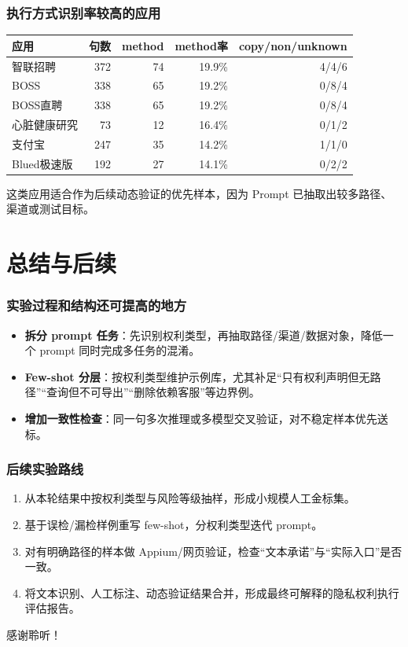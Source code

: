 \documentclass[AutoFakeBold,AutoFakeSlant]{beamer}
\begin{document}
\begin{frame}
    \frametitle{执行方式识别率较高的应用}
    \tiny
    \begin{tabularx}{\textwidth}{|l|r|r|r|r|}
        \toprule
        \textbf{应用} & \textbf{句数} & \textbf{method} & \textbf{method率} & \textbf{copy/non/unknown} \\
        \midrule
        智联招聘 & 372 & 74 & 19.9\% & 4/4/6 \\
        BOSS & 338 & 65 & 19.2\% & 0/8/4 \\
        BOSS直聘 & 338 & 65 & 19.2\% & 0/8/4 \\
        心脏健康研究 & 73 & 12 & 16.4\% & 0/1/2 \\
        支付宝 & 247 & 35 & 14.2\% & 1/1/0 \\
        Blued极速版 & 192 & 27 & 14.1\% & 0/2/2 \\
        \bottomrule
    \end{tabularx}
    \vspace{0.4em}
    \scriptsize
    这类应用适合作为后续动态验证的优先样本，因为 Prompt 已抽取出较多路径、渠道或测试目标。
\end{frame}

\section{总结与后续}

\begin{frame}
    \frametitle{实验过程和结构还可提高的地方}
    \small
    \begin{itemize}
        \item \textbf{拆分 prompt 任务}：先识别权利类型，再抽取路径/渠道/数据对象，降低一个 prompt 同时完成多任务的混淆。
        \item \textbf{Few-shot 分层}：按权利类型维护示例库，尤其补足“只有权利声明但无路径”“查询但不可导出”“删除依赖客服”等边界例。
        \item \textbf{增加一致性检查}：同一句多次推理或多模型交叉验证，对不稳定样本优先送标。
    \end{itemize}
\end{frame}

\begin{frame}
    \frametitle{后续实验路线}
    \small
    \begin{enumerate}
        \item 从本轮结果中按权利类型与风险等级抽样，形成小规模人工金标集。
        \item 基于误检/漏检样例重写 few-shot，分权利类型迭代 prompt。
        \item 对有明确路径的样本做 Appium/网页验证，检查“文本承诺”与“实际入口”是否一致。
        \item 将文本识别、人工标注、动态验证结果合并，形成最终可解释的隐私权利执行评估报告。
    \end{enumerate}
\end{frame}

\begin{frame}
    \begin{center}
        {\Huge 感谢聆听！}
    \end{center}
\end{frame}
\end{document}
